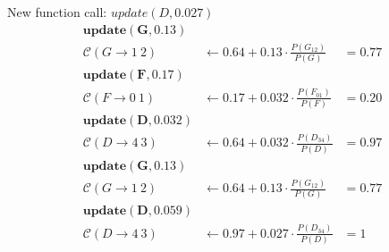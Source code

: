 \documentclass{article}
\newcommand{\C}{\mathcal{C}}
\begin{document}
New function call: $update(D,0.027)$
\begin{align*}
\mathbf{update(G,0.13)}\\
\C(G\rightarrow 1~2) &\leftarrow 0.64 + 0.13 \cdot \frac{P(G_{12})}{P(G)} &= 0.77\\
\mathbf{update(F,0.17)}\\
\C(F\rightarrow 0~1) &\leftarrow 0.17 + 0.032\cdot \frac{P(F_{01})}{P(F)} &= 0.20\\
\mathbf{update(D,0.032)}\\
\C(D\rightarrow 4~3) &\leftarrow 0.64 + 0.032\cdot \frac{P(D_{34})}{P(D)} &= 0.97\\
\mathbf{update(G,0.13)}\\
\C(G\rightarrow 1~2) &\leftarrow  0.64 + 0.13 \cdot \frac{P(G_{12})}{P(G)} &= 0.77\\
\mathbf{update(D,0.059)}\\
\C(D\rightarrow 4~3) &\leftarrow 0.97 + 0.027\cdot \frac{P(D_{34})}{P(D)} &= 1
\end{align*}
\end{document}
